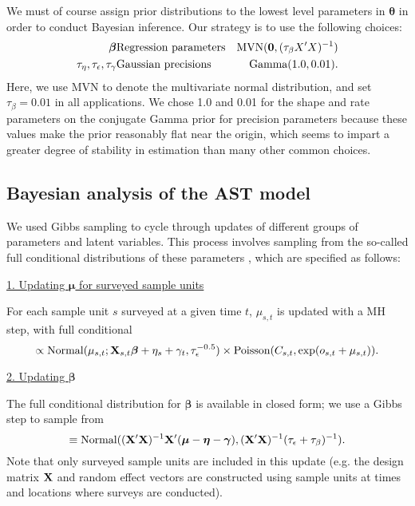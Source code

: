 \documentclass[12pt,fleqn]{article}
\begin{document}
\begin{flushleft}
\hspace{.5in} We must of course assign prior distributions to the lowest level parameters in $\boldsymbol{\theta}$ in order to conduct Bayesian inference.  Our strategy is to use the following choices:
\begin{eqnarray*}
  \boldsymbol{\beta} & \textrm{Regression parameters} & {\rm MVN}({\bf 0},(\tau_\beta X^\prime X)^{-1}) \\
  \tau_\eta,\tau_\epsilon,\tau_\gamma & \textrm{Gaussian precisions} & \textrm{Gamma}(1.0,0.01).
  \label{eq:priors}
\end{eqnarray*}
Here, we use MVN to denote the multivariate normal distribution, and set $\tau_\beta=0.01$ in all applications.  We chose 1.0 and 0.01 for the shape and rate parameters on the conjugate Gamma prior for precision parameters because these values make the prior reasonably flat near the origin, which seems to impart a greater degree of stability in estimation than many other common choices.

\subsection{Bayesian analysis of the AST model}

We used Gibbs sampling to cycle through updates of different groups of parameters and latent variables.  This process involves sampling from the so-called full conditional distributions of these parameters \citep{GelmanEtAl2004}, which are specified as follows:

\underline{1. Updating $\boldsymbol{\mu}$ for surveyed sample units}

For each sample unit $s$ surveyed at a given time $t$, $\mu_{s,t}$ is updated with a MH step, with
full conditional
\begin{equation*}
  [\mu_{s,t} | \cdot] \propto \textrm{Normal}(\mu_{s,t};{\bf X}_{s,t} \boldsymbol{\beta} + \eta_s + \gamma_t,\tau_\epsilon^{-0.5}) \times \textrm{Poisson}(C_{s,t},\exp(o_{s,t}+\mu_{s,t})).
\end{equation*}

\underline{2. Updating $\boldsymbol{\beta}$}

The full conditional distribution for $\boldsymbol{\beta}$ is available in closed form; we use a Gibbs step to sample from
\begin{equation*}
  [\boldsymbol{\beta} | \cdot] \equiv \textrm{Normal}(({\bf X}^\prime {\bf X})^{-1}{\bf X}^\prime (\boldsymbol{\mu} - \boldsymbol{\eta} - \boldsymbol{\gamma}),({\bf X}^\prime {\bf X})^{-1} (\tau_\epsilon + \tau_\beta)^{-1}).
\end{equation*}
Note that only surveyed sample units are included in this update (e.g. the design matrix ${\bf X}$ and random effect vectors are constructed using sample units at times and locations where surveys are conducted).


\end{flushleft}
\end{document}
